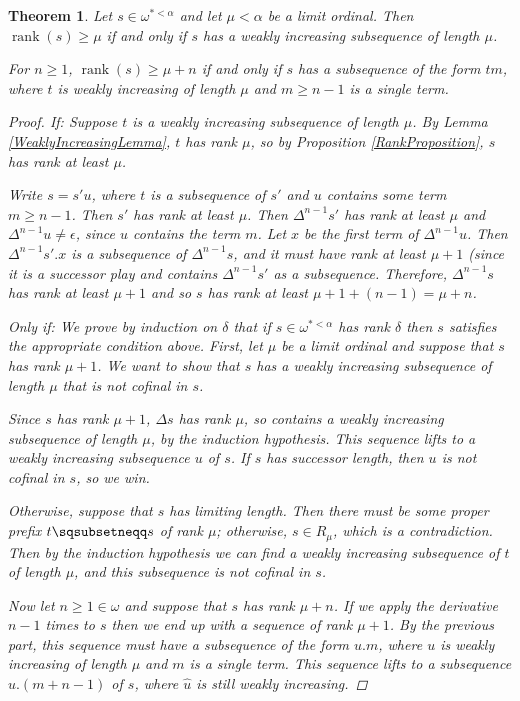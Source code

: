 \documentclass[11pt]{article} %
\theoremstyle{plain} %
\newtheorem{theorem}{Theorem}[section]
\theoremstyle{definition} %
\theoremstyle{note}
\theoremstyle{exercisestyle}
\newcommand{\emptyplay}{\epsilon}
\newcommand{\pprefix}{\sqsubsetneqq}
\DeclareMathOperator{\rank}{rank}
\begin{document}
\begin{theorem}
  Let $s\in\omega^{*<\alpha}$ and let $\mu<\alpha$ be a limit ordinal.  Then $\rank(s)\ge\mu$ if and only if $s$ has a weakly increasing subsequence of length $\mu$.  

  For $n\ge 1$, $\rank(s)\ge\mu+n$ if and only if $s$ has a subsequence of the form $tm$, where $t$ is weakly increasing of length $\mu$ and $m\ge n-1$ is a single term.

  \begin{proof}
    \emph{If: } Suppose $t$ is a weakly increasing subsequence of length $\mu$.  By Lemma \ref{WeaklyIncreasingLemma}, $t$ has rank $\mu$, so by Proposition \ref{RankProposition}, $s$ has rank at least $\mu$.  

    Write $s=s'u$, where $t$ is a subsequence of $s'$ and $u$ contains some term $m\ge n-1$.  Then $s'$ has rank at least $\mu$.  Then $\Delta^{n-1} s'$ has rank at least $\mu$ and $\Delta^{n-1}u\ne\emptyplay$, since $u$ contains the term $m$.  Let $x$ be the first term of $\Delta^{n-1}u$.  Then $\Delta^{n-1}s'.x$ is a subsequence of $\Delta^{n-1}s$, and it must have rank at least $\mu+1$ (since it is a successor play and contains $\Delta^{n-1}s'$ as a subsequence.  Therefore, $\Delta^{n-1}s$ has rank at least $\mu+1$ and so $s$ has rank at least $\mu+1+(n-1)=\mu+n$.  

    \emph{Only if: } We prove by induction on $\delta$ that if $s\in\omega^{*<\alpha}$ has rank $\delta$ then $s$ satisfies the appropriate condition above.  First, let $\mu$ be a limit ordinal and suppose that $s$ has rank $\mu+1$.  We want to show that $s$ has a weakly increasing subsequence of length $\mu$ that is not cofinal in $s$.  

    Since $s$ has rank $\mu+1$, $\Delta s$ has rank $\mu$, so contains a weakly increasing subsequence of length $\mu$, by the induction hypothesis.  This sequence lifts to a weakly increasing subsequence $u$ of $s$.  If $s$ has successor length, then $u$ is not cofinal in $s$, so we win.  

    Otherwise, suppose that $s$ has limiting length.  Then there must be some proper prefix $t\pprefix s$ of rank $\mu$; otherwise, $s\in R_\mu$, which is a contradiction.  Then by the induction hypothesis we can find a weakly increasing subsequence of $t$ of length $\mu$, and this subsequence is not cofinal in $s$.  

    Now let $n\ge1\in\omega$ and suppose that $s$ has rank $\mu+n$.  If we apply the derivative $n-1$ times to $s$ then we end up with a sequence of rank $\mu+1$.  By the previous part, this sequence must have a subsequence of the form $u.m$, where $u$ is weakly increasing of length $\mu$ and $m$ is a single term.  This sequence lifts to a subsequence $\hat u.(m+n-1)$ of $s$, where $\hat u$ is still weakly increasing.  


\end{proof}
\end{theorem}
\end{document}
